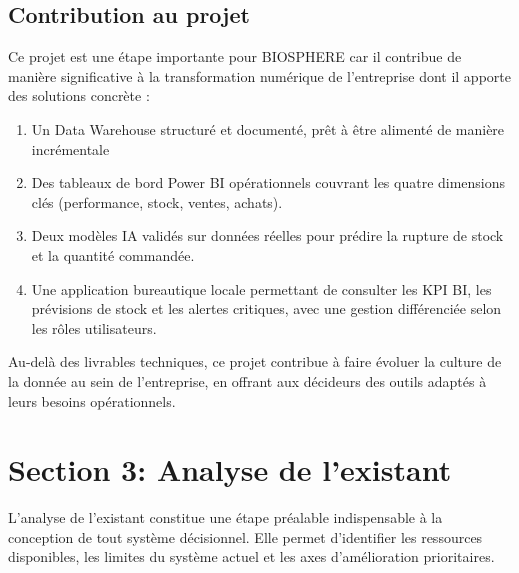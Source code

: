 \subsection{Contribution au projet}
Ce projet est une étape importante pour BIOSPHERE car il contribue de manière significative à la transformation numérique de l'entreprise dont il apporte des solutions concrète :
\begin{enumerate}
    \item Un Data Warehouse structuré et documenté, prêt à être alimenté de manière incrémentale
    \item Des tableaux de bord Power BI opérationnels couvrant les quatre dimensions clés (performance, stock, ventes, achats).
    \item Deux modèles IA validés sur données réelles pour prédire la rupture de stock et la quantité commandée.
    \item Une application bureautique locale permettant de consulter les KPI BI, les prévisions de stock et les alertes critiques, avec une gestion différenciée selon les rôles utilisateurs.
\end{enumerate}
Au-delà des livrables techniques, ce projet contribue à faire évoluer la culture de la donnée au sein de l'entreprise, en offrant aux décideurs des outils adaptés à leurs besoins opérationnels.
\section{Section 3: Analyse de l'existant}
L'analyse de l'existant constitue une étape préalable indispensable à la conception de tout système décisionnel. Elle permet d'identifier les ressources disponibles, les limites du système actuel et les axes d'amélioration prioritaires.
